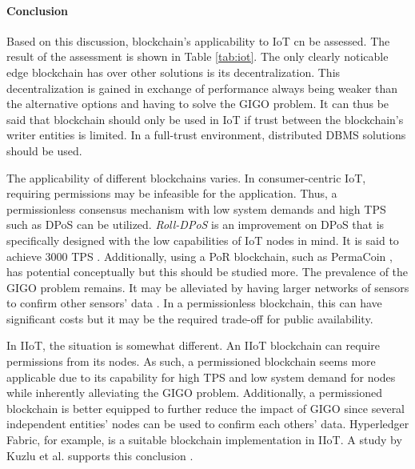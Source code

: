 \paragraph{Conclusion} Based on this discussion, blockchain's
applicability to IoT cn be assessed. The result of the assessment is
shown in Table \ref{tab:iot}. The only clearly noticable edge blockchain
has over other solutions is its decentralization. This
decentralization is gained in exchange of performance always being
weaker than the alternative options and having to solve the GIGO
problem. It can thus be said that blockchain should only be used in
IoT if trust between the blockchain's writer entities is limited. In a
full-trust environment, distributed DBMS solutions should be used.

The applicability of different blockchains varies. In consumer-centric
IoT, requiring permissions may be infeasible for the application.
Thus, a permissionless consensus mechanism with low system demands and
high TPS such as DPoS can be utilized. \textit{Roll-DPoS} is an
improvement on DPoS that is specifically designed with the low
capabilities of IoT nodes in mind. It is said to achieve 3000 TPS
\cite{sankaScalability}. Additionally, using a PoR blockchain, such as
PermaCoin \cite{millerPermacoin}, has potential conceptually but this
should be studied more. The prevalence of the GIGO problem remains. It
may be alleviated by having larger networks of sensors to confirm
other sensors' data \cite{babichDistributed}. In a permissionless
blockchain, this can have significant costs but it may be the required
trade-off for public availability.

In IIoT, the situation is somewhat different. An IIoT blockchain can
require permissions from its nodes. As such, a permissioned blockchain
seems more applicable due to its capability for high TPS and low
system demand for nodes while inherently alleviating the GIGO problem.
Additionally, a permissioned blockchain is better equipped to further
reduce the impact of GIGO since several independent entities' nodes
can be used to confirm each others' data. Hyperledger Fabric, for
example, is a suitable blockchain implementation in IIoT. A study by
Kuzlu et al. supports this conclusion \cite{kuzluPerformance}.

